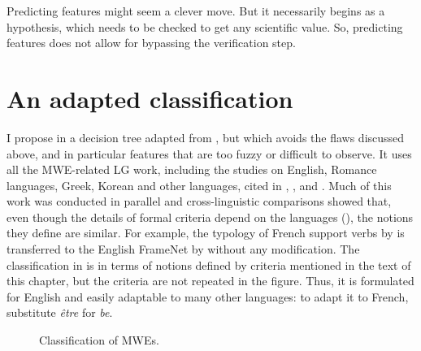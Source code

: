 \documentclass[output=paper]{langsci/langscibook}
\begin{document}
Predicting features might seem a clever move. But it necessarily begins as a hypothesis, which needs to be checked to get any scientific value. So, predicting features does not allow for bypassing the verification step.

\section{An adapted classification}
\label{sec:6}

I propose in  a decision tree adapted from \citet[279]{Baldwin2010}, but which avoids the flaws discussed above, and in particular features that are too fuzzy or difficult to observe. It uses all the MWE-related LG work, including the studies on English, Romance languages, Greek, Korean and other languages, cited in  , ,  and . Much of this work was conducted in parallel and cross-linguistic comparisons showed that, even though the details of formal criteria depend on the languages (), the notions they define are similar. For example, the typology of French support verbs by \citet{Gross1998} is transferred to the English FrameNet by \cite[37-38]{Ruppenhofer}  without any modification. The classification in  is in terms of notions defined by criteria mentioned in the text of this chapter, but the criteria are not repeated in the figure. Thus, it is formulated for English and easily adaptable to many other languages: to adapt it to French, substitute \textit{être} for \textit{be}.

\begin{figure}[h]
\centering
\caption{Classification of MWEs.}
\label{fig:1}
\end{figure}
\end{document}
